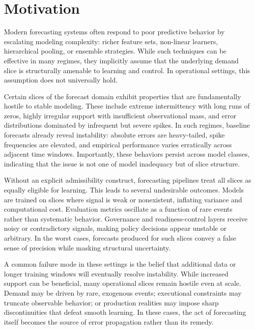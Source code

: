 
\section{Motivation}
\label{sec:fas_motivation}

Modern forecasting systems often respond to poor predictive behavior by
escalating modeling complexity: richer feature sets, non-linear learners,
hierarchical pooling, or ensemble strategies. While such techniques can be
effective in many regimes, they implicitly assume that the underlying demand
slice is structurally amenable to learning and control. In operational settings,
this assumption does not universally hold.

Certain slices of the forecast domain exhibit properties that are fundamentally
hostile to stable modeling. These include extreme intermittency with long runs of
zeros, highly irregular support with insufficient observational mass, and error
distributions dominated by infrequent but severe spikes. In such regimes,
baseline forecasts already reveal instability: absolute errors are heavy-tailed,
spike frequencies are elevated, and empirical performance varies erratically
across adjacent time windows. Importantly, these behaviors persist across model
classes, indicating that the issue is not one of model inadequacy but of slice
structure.

Without an explicit admissibility construct, forecasting pipelines treat all
slices as equally eligible for learning. This leads to several undesirable
outcomes. Models are trained on slices where signal is weak or nonexistent,
inflating variance and computational cost. Evaluation metrics oscillate as a
function of rare events rather than systematic behavior. Governance and
readiness-control layers receive noisy or contradictory signals, making policy
decisions appear unstable or arbitrary. In the worst cases, forecasts produced
for such slices convey a false sense of precision while masking structural
uncertainty.

A common failure mode in these settings is the belief that additional data or
longer training windows will eventually resolve instability. While increased
support can be beneficial, many operational slices remain hostile even at scale.
Demand may be driven by rare, exogenous events; executional constraints may
truncate observable behavior; or production realities may impose sharp
discontinuities that defeat smooth learning. In these cases, the act of
forecasting itself becomes the source of error propagation rather than its
remedy.

